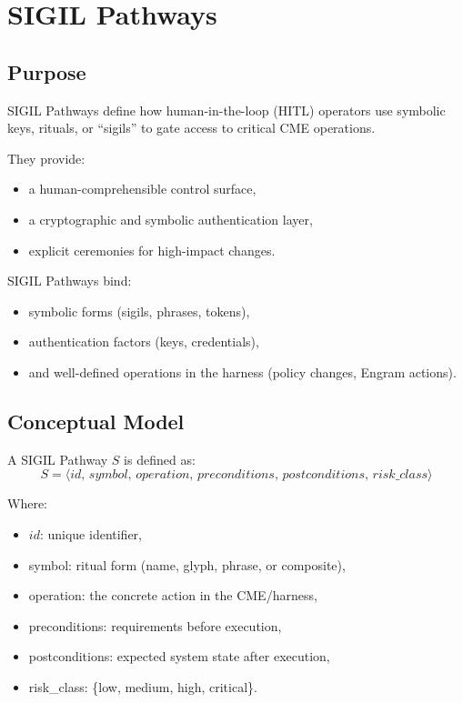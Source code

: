 \chapter{SIGIL Pathways}
\label{chap:SIGIL_Pathways}

\section{Purpose}

SIGIL Pathways define how human-in-the-loop (HITL) operators use symbolic keys,
rituals, or ``sigils'' to gate access to critical CME operations.

They provide:
\begin{itemize}
    \item a human-comprehensible control surface,
    \item a cryptographic and symbolic authentication layer,
    \item explicit ceremonies for high-impact changes.
\end{itemize}

SIGIL Pathways bind:
\begin{itemize}
    \item symbolic forms (sigils, phrases, tokens),
    \item authentication factors (keys, credentials),
    \item and well-defined operations in the harness (policy changes, Engram actions).
\end{itemize}

\section{Conceptual Model}

A SIGIL Pathway $S$ is defined as:
\[
S = \langle id,\, symbol,\, operation,\, preconditions,\, postconditions,\, risk\_class \rangle
\]

Where:
\begin{itemize}
    \item $id$: unique identifier,
    \item symbol: ritual form (name, glyph, phrase, or composite),
    \item operation: the concrete action in the CME/harness,
    \item preconditions: requirements before execution,
    \item postconditions: expected system state after execution,
    \item risk\_class: \{low, medium, high, critical\}.
\end{itemize}

